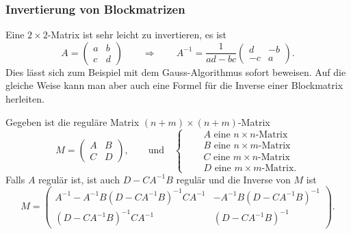 %
%
\subsubsection{Invertierung von Blockmatrizen}
Eine $2\times 2$-Matrix ist sehr leicht zu invertieren, es ist
\begin{equation}
A=\begin{pmatrix}
a&b\\
c&d
\end{pmatrix}
\qquad\Rightarrow\qquad
A^{-1}
=
\frac{1}{ad-bc}
\begin{pmatrix}
d&-b\\
-c&a
\end{pmatrix}.
\label{buch:qm:eqn:inverse22}
\end{equation}
Dies lässt sich zum Beispiel mit dem Gauss-Algorithmus sofort
beweisen.
Auf die gleiche Weise kann man aber auch eine Formel für die Inverse
einer Blockmatrix herleiten.

\begin{lemma}
\label{buch:qm:lemma:blockinverse}
Gegeben ist die reguläre Matrix $(n+m)\times(n+m)$-Matrix
\[
M = \begin{pmatrix}
A&B\\
C&D
\end{pmatrix},
\qquad\text{und}\quad\left\{
\quad
\begin{aligned}
&\text{$A$ eine $n\times n$-Matrix}\\
&\text{$B$ eine $n\times m$-Matrix}\\
&\text{$C$ eine $m\times n$-Matrix}\\
&\text{$D$ eine $m\times m$-Matrix}.
\end{aligned}
\right.
\]
Falls $A$ regulär ist, ist auch $D-CA^{-1}B$ regulär und
die Inverse von $M$ ist
\begin{equation}
M
=
\begin{pmatrix}
A^{-1} - A^{-1}B(D-CA^{-1}B)^{-1}CA^{-1}  & -A^{-1}B(D-CA^{-1}B)^{-1} \\
(D-CA^{-1}B)^{-1}CA^{-1}                 & (D-CA^{-1}B)^{-1}
\end{pmatrix}.
\label{buch:qm:eqn:blockinverse}
\end{equation}
\end{lemma}

